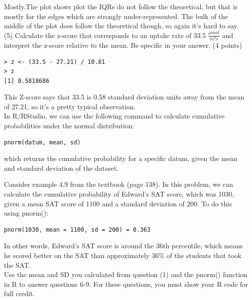 \documentclass{article}
\begin{document}
Mostly.The plot shows plot the IQRs do not follow the theoretical, but that is mostly for the edges which are strongly under-represented. The bulk of the middle of the plot does follow the theoretical though, so again it's hard to say.\\

(5) Calculate the z-score that corresponds to an uptake rate of 33.5 $\frac{\mu mol}{m^{2}s}$ and interpret the z-score relative to the mean. Be specific in your answer. (4 points)

\begin{center}
\begin{lstlisting}
> z <- (33.5 - 27.21) / 10.81
> z
[1] 0.5818686
\end{lstlisting}
\end{center}
This Z-score says that 33.5 is 0.58 standard deviation units away from the mean of 27.21, so it's a pretty typical observation.\\

In R/RStudio, we can use the following command to calculate cumulative probabilities under the normal distribution:
\begin{center}
\begin{lstlisting}
pnorm(datum, mean, sd)
\end{lstlisting}
\end{center}

which returns the cumulative probability for a specific datum, given the mean and standard deviation of the dataset.

 

Consider example 4.9 from the textbook (page 138). In this problem, we can calculate the cumulative probability of Edward's SAT score, which was 1030, given a mean SAT score of 1100 and a standard deviation of 200. To do this using pnorm():\\
\begin{center}
\begin{lstlisting}
pnorm(1030, mean = 1100, sd = 200) = 0.363
\end{lstlisting}
\end{center}


In other words, Edward's SAT score is around the 36th percentile, which means he scored better on the SAT than approximately 36\% of the students that took the SAT.\\

Use the mean and SD you calculated from question (1) and the pnorm() function in R to answer questions 6-9. For these questions, you must show your R code for full credit.\\
\end{document}

